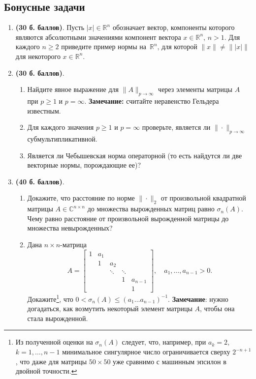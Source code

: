 \documentclass[a4paper, 11pt]{article}
\begin{document}
	\subsection*{Бонусные задачи}
	\begin{enumerate}
		\item \textbf{(30 б. баллов)}. Пусть $|x|\in\mathbb{R}^n$ обозначает вектор, компоненты которого являются абсолютными значениями компонент вектора $x\in\mathbb{R}^n$, $n>1$. Для каждого $n\geq 2$ приведите пример нормы на~$\mathbb{R}^n$, для которой $\|x\| \not = \left\| |x| \right\|$ для некоторого $x\in\mathbb{R}^n$.
		\item \textbf{(30 б. баллов)}.
		\begin{enumerate}
			\item Найдите явное выражение для $\|A\|_{p \to \infty}$ через элементы матрицы $A$ при $p\geq 1$ и $p=\infty$. \textbf{Замечание:} считайте неравенство Гельдера известным. 
			\item Для каждого значения $p\geq  1$  и $p=\infty$ проверьте, является ли $\|\cdot\|_{p \to \infty}$ субмультипликативной.
			\item Является ли Чебышевская норма операторной (то есть найдутся ли две векторные нормы, порождающие ее)? 
		\end{enumerate}
		\item \textbf{(40 б. баллов)}.\begin{enumerate}
			\item Докажите, что расстояние по норме $\|\cdot\|_2$ от произвольной квадратной матрицы $A \in \mathbb{C}^{n\times n}$ до множества вырожденных матриц равно $\sigma_{n}(A)$. Чему равно расстояние от произвольной вырожденной матрицы до множества невырожденных?
			\item Дана $n \times n$-матрица 
			\[ 
			A = \begin{bmatrix}
				1 & a_1 &         &        &   \\
				& 1   &  a_2    &        &    \\
				&     &  \ddots & \ddots &    \\
				&     &         &  1     & a_{n-1} \\
				&     &         &        & 1 
			\end{bmatrix}, \quad a_1, \dots, a_{n-1} > 0.
			\]
			Докажите\footnote{Из полученной оценки на $\sigma_n(A)$ следует, что, например, при $a_k =2$, $k=1,\dots,n-1$ минимальное сингулярное число ограничивается сверху $2^{-n+1}$, что даже для матрицы $50\times 50$ уже сравнимо с машинным эпсилон в двойной точности.}, что $0 < \sigma_n(A) \leq (a_1\dots a_{n-1})^{-1}$. \textbf{Замечание}: нужно догадаться, как возмутить некоторый элемент матрицы $A$, чтобы она стала вырожденной. 
		\end{enumerate}
	\end{enumerate}
	
\end{document}
